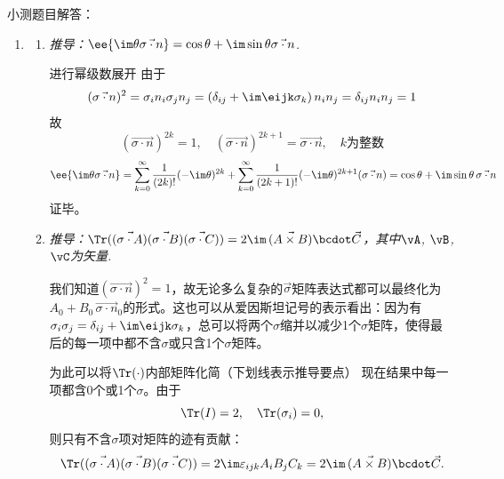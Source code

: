 小测题目解答：
\begin{enumerate}[label=\textbf{6.\Alph*}, listparindent=\parindent]

\item 
\begin{enumerate}[listparindent=\parindent]
\item \emph{推导：$\ee{\im\theta \vec{\sigma\cdot n}}=\cos\theta+\im\sin\theta\vec{\sigma\cdot n}$.}

进行幂级数展开
由于
\[(\vec{\sigma\cdot n})^2 = \sigma_in_i\sigma_j n_j = (\delta_{ij}+\im\eijk\sigma_k)\,n_in_j = \delta_{ij}n_in_j = 1\]
故\[(\vec{\sigma\cdot n})^{2k}=1,\quad(\vec{\sigma\cdot n})^{2k+1}=\vec{\sigma\cdot n},\quad \text{$k$为整数}\]
\[\ee{\im\theta\vec{\sigma\cdot n}}=\sum_{k=0}^{\infty}\frac{1}{(2k)!}(-\im\theta)^{2k}+\sum_{k=0}^{\infty}\frac{1}{(2k+1)!}(-\im\theta)^{2k+1}(\vec{\sigma\cdot n})=\cos\theta + \im\sin\theta\,\vec{\sigma\cdot n}\]
证毕。

\item \emph{推导：$\Tr((\vec{\sigma\cdot A})(\vec{\sigma\cdot B})(\vec{\sigma\cdot C})) = 2\im\,(\vec{A\times B})\bcdot\vec{C}$，其中$\vA$, $\vB$, $\vC$为矢量.}

我们知道$(\vec{\sigma\cdot n})^2=1$，故无论多么复杂的$\vec{\sigma}$矩阵表达式都可以最终化为$A_0+B_0\,\vec{\sigma\cdot n}_0$的形式。这也可以从爱因斯坦记号的表示看出：因为有$\sigma_i\sigma_j=\delta_{ij}+\im\eijk\sigma_k$，总可以将两个$\sigma$缩并以减少1个$\sigma$矩阵，使得最后的每一项中都不含$\sigma$或只含1个$\sigma$矩阵。

为此可以将$\Tr(\cdot)$内部矩阵化简（下划线表示推导要点）
现在结果中每一项都含0个或1个$\sigma$。由于
\[\Tr(I)=2,\quad \Tr(\sigma_i)=0,\]
则只有不含$\sigma$项对矩阵的迹有贡献：\[\Tr((\vec{\sigma\cdot A})(\vec{\sigma\cdot B})(\vec{\sigma\cdot C}))=2\im\varepsilon_{ijk}A_iB_jC_k=2\im\,(\vec{A\times B})\bcdot\vec{C}.\]


\end{enumerate}
\end{enumerate}
